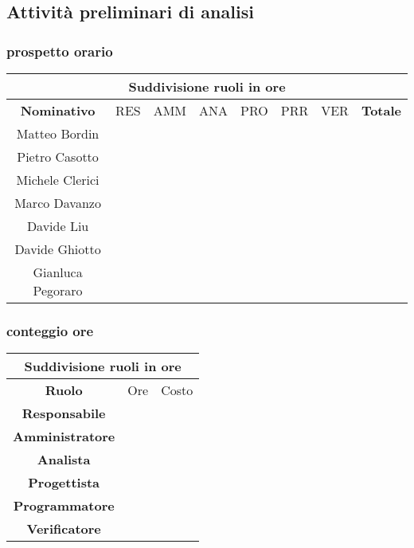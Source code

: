 \subsection{Attività preliminari di analisi}
	\subsubsection{prospetto orario}
	
		\begin{tabular}{c c c c c c c|c }
			\hline
			\multicolumn{8}{|c|}{\textbf{Suddivisione ruoli in ore}}\\
			\hline
			\textbf{Nominativo} & RES & AMM & ANA & PRO & PRR & VER & \textbf{Totale} \\
			\hline
			Matteo Bordin\\
			\hline
			Pietro Casotto\\
			\hline
			Michele Clerici\\
			\hline
			Marco Davanzo\\
			\hline
			Davide Liu\\
			\hline
			Davide Ghiotto\\
			\hline
			Gianluca Pegoraro\\
			\hline

		\end{tabular}
	
	\subsubsection{conteggio ore}
		\begin{tabular}{ c c c}
			\hline
			\multicolumn{3}{|c|}{\textbf{Suddivisione ruoli in ore}}\\
			\hline
			\textbf{Ruolo} & Ore & Costo\\
			\hline
			\textbf{Responsabile} \\
			\hline
			\textbf{Amministratore} \\
			\hline
			\textbf{Analista} \\
			\hline
			\textbf{Progettista} \\
			\hline
			\textbf{Programmatore}  \\
			\hline
			\textbf{Verificatore} \\
			\hline 
		\end{tabular}
